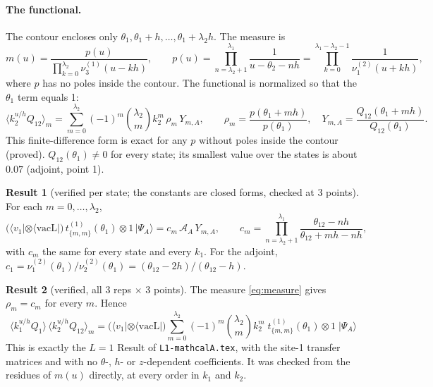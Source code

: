 \documentclass[11pt]{article}
\newcommand{\vacL}{\langle\mathrm{vacL}|}
\newcommand{\nb}[1]{\texttt{#1}}
\theoremstyle{definition}
\newtheorem{result}{Result}
\theoremstyle{remark}
\begin{document}
\paragraph{The functional.}
The contour encloses only $\theta_1,\theta_1+h,\dots,\theta_1+\lambda_2h$. The measure is
\begin{equation}\label{eq:measure}
m(u)=\frac{p(u)}{\prod_{k=0}^{\lambda_2}\nu^{(1)}_3(u-kh)},\qquad
p(u)=\prod_{n=\lambda_2+1}^{\lambda_1}\frac{1}{u-\theta_2-nh}=\prod_{k=0}^{\lambda_1-\lambda_2-1}\frac{1}{\nu^{(2)}_1(u+kh)} ,
\end{equation}
where $p$ has no poles inside the contour. The functional is normalized so that the $\theta_1$ term equals 1:
\begin{equation}\label{eq:F}
\langle k_2^{u/h}Q_{12}\rangle_m=\sum_{m=0}^{\lambda_2}(-1)^m\binom{\lambda_2}{m}k_2^m\,\rho_m\,Y_{m,A},\qquad
\rho_m=\frac{p(\theta_1+mh)}{p(\theta_1)},\quad Y_{m,A}=\frac{Q_{12}(\theta_1+mh)}{Q_{12}(\theta_1)} .
\end{equation}
This finite-difference form is exact for any $p$ without poles inside the contour (proved). $Q_{12}(\theta_1)\neq0$ for every state; its smallest value over the states is about $0.07$ (adjoint, point 1).

\begin{result}[verified per state; the constants are closed forms, checked at 3 points]\label{res:cm}
For each $m=0,\dots,\lambda_2$,
\begin{equation}\label{eq:cm}
\big(\langle v_1|\otimes\vacL\big)\,t^{(1)}_{\{m,m\}}(\theta_1)\otimes1\,|\Psi_A\rangle=c_m\,\mathcal A_A\,Y_{m,A},\qquad
c_m=\prod_{n=\lambda_2+1}^{\lambda_1}\frac{\theta_{12}-nh}{\theta_{12}+mh-nh},
\end{equation}
with $c_m$ the same for every state and every $k_1$. For the adjoint, $c_1=\nu^{(2)}_1(\theta_1)/\nu^{(2)}_2(\theta_1)=(\theta_{12}-2h)/(\theta_{12}-h)$.
\end{result}

\begin{result}[verified, all 3 reps $\times$ 3 points]\label{res:second}
The measure \eqref{eq:measure} gives $\rho_m=c_m$ for every $m$. Hence
\begin{equation}
\boxed{\;\langle k_1^{u/h}Q_1\rangle\,\langle k_2^{u/h}Q_{12}\rangle_m=\big(\langle v_1|\otimes\vacL\big)\sum_{m=0}^{\lambda_2}(-1)^m\binom{\lambda_2}{m}k_2^m\;t^{(1)}_{\{m,m\}}(\theta_1)\otimes1\;|\Psi_A\rangle\;}
\end{equation}
This is exactly the $L=1$ Result of \nb{L1-mathcalA.tex}, with the site-1 transfer matrices and with no $\theta$-, $h$- or $z$-dependent coefficients. It was checked from the residues of $m(u)$ directly, at every order in $k_1$ and $k_2$.
\end{result}
\end{document}
